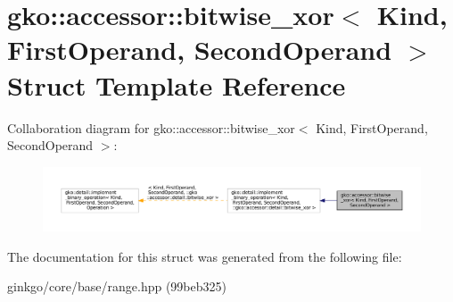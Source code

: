 \hypertarget{structgko_1_1accessor_1_1bitwise__xor}{}\section{gko\+:\+:accessor\+:\+:bitwise\+\_\+xor$<$ Kind, First\+Operand, Second\+Operand $>$ Struct Template Reference}
\label{structgko_1_1accessor_1_1bitwise__xor}


Collaboration diagram for gko\+:\+:accessor\+:\+:bitwise\+\_\+xor$<$ Kind, First\+Operand, Second\+Operand $>$\+:
\nopagebreak
\begin{figure}[H]
\begin{center}
\leavevmode
\includegraphics[width=350pt]{structgko_1_1accessor_1_1bitwise__xor__coll__graph}
\end{center}
\end{figure}


The documentation for this struct was generated from the following file\+:\begin{DoxyCompactItemize}
\item 
ginkgo/core/base/range.\+hpp (99beb325)\end{DoxyCompactItemize}
